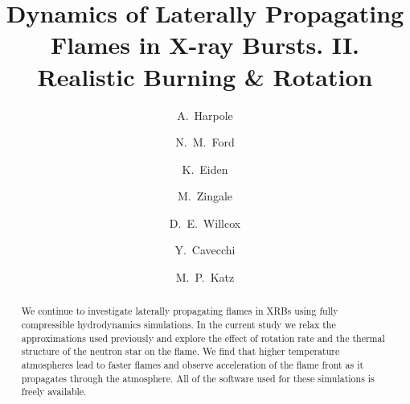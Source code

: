 \documentclass[preprint,times,tighten]{aastex63}
\begin{document}
\title{Dynamics of Laterally Propagating Flames in X-ray Bursts. II. Realistic Burning \& Rotation}


\author[0000-0002-1530-781X]{A.\ Harpole}

\author[0000-0001-8921-3624]{N.\ M.\ Ford}

\author[0000-0001-6191-4285]{K.\ Eiden}

\author[0000-0001-8401-030X]{M.\ Zingale}

\author[0000-0003-2300-5165]{D.\ E.\ Willcox}

\author[0000-0002-6447-3603]{Y.\ Cavecchi}

\author[0000-0003-0439-4556]{M.\ P.\ Katz}




\begin{abstract}
We continue to investigate laterally propagating flames in XRBs using
fully compressible hydrodynamics simulations.  In the current study we
relax the approximations used previously and explore the effect of
rotation rate and the thermal structure of the neutron star on the
flame.  We find that higher temperature atmospheres lead to faster
flames and observe acceleration of the flame front as it propagates
through the atmosphere.  All of the software used for these
simulations is freely available.


\end{abstract}
\end{document}
